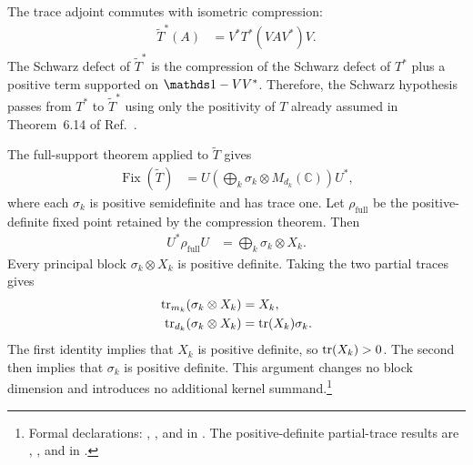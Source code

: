 \documentclass{article}
\begin{document}
The trace adjoint commutes with isometric compression:
\begin{align}
  \widetilde T^*(A)
    &=V^*T^*(VAV^*)V.
  \label{eq:wolf_theorem6_14_fixed_point_projection_gap_compressed_trace_adjoint}
\end{align}
The Schwarz defect of $\widetilde T^*$ is the compression of the Schwarz defect
of $T^*$ plus a positive term supported on $\Id-VV^*$. Therefore, the Schwarz
hypothesis passes from $T^*$ to $\widetilde T^*$ using only the positivity of
$T$ already assumed in Theorem~6.14 of Ref.~\cite{Wolf2012Quantum}.

The full-support theorem applied to $\widetilde T$ gives
\begin{align}
  \operatorname{Fix}(\widetilde T)
    &=U\left(\bigoplus_k
      \sigma_k\otimes M_{d_k}(\mathbb C)\right)U^*,
  \label{eq:wolf_theorem6_14_fixed_point_projection_gap_compressed_density_blocks}
\end{align}
where each $\sigma_k$ is positive semidefinite and has trace one. Let
$\rho_{\mathrm{full}}$ be the positive-definite fixed point retained by the
compression theorem. Then
\begin{align}
  U^*\rho_{\mathrm{full}}U
    &=\bigoplus_k\sigma_k\otimes X_k.
  \label{eq:wolf_theorem6_14_fixed_point_projection_gap_full_support_state_blocks}
\end{align}
Every principal block $\sigma_k\otimes X_k$ is positive definite. Taking the
two partial traces gives
\begin{align}
  \operatorname{tr}_{m_k}(\sigma_k\otimes X_k)
    &=X_k,
  \label{eq:wolf_theorem6_14_fixed_point_projection_gap_partial_trace_multiplicity}\\
  \operatorname{tr}_{d_k}(\sigma_k\otimes X_k)
    &=\operatorname{tr}(X_k)\sigma_k.
  \label{eq:wolf_theorem6_14_fixed_point_projection_gap_partial_trace_matrix}
\end{align}
The first identity implies that $X_k$ is positive definite, so
$\operatorname{tr}(X_k)>0$. The second then implies that $\sigma_k$ is positive definite.
This argument changes no block dimension and introduces no additional kernel
summand.\footnote{Formal declarations:
,
, and
in
. The
positive-definite partial-trace results are
,
, and
 in
.}
\end{document}
